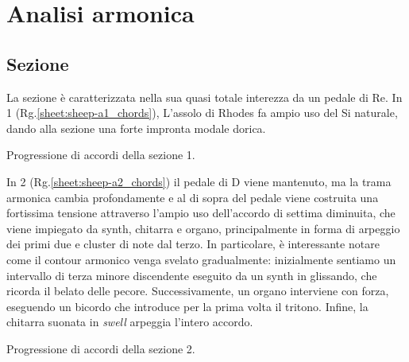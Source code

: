 \documentclass[class=book, crop=false, oneside, 12pt]{standalone}
\begin{document}

    \section{Analisi armonica}
    \label{sec:04-harmony}

    \subsection{Sezione }
    La sezione  è caratterizzata nella sua quasi totale interezza da un pedale di Re. In 1 (Rg.\ref{sheet:sheep-a1_chords}), L'assolo di Rhodes fa ampio uso del Si naturale, dando alla sezione una forte impronta modale dorica.     
    
    \begin{sheet}[htb]
        \centering
        \caption{Progressione di accordi della sezione 1.}
        \label{sheet:sheep-a1_chords}
    \end{sheet}

    In 2 (Rg.\ref{sheet:sheep-a2_chords}) il pedale di D viene mantenuto, ma la trama armonica cambia profondamente e al di sopra del pedale viene costruita una fortissima tensione attraverso l'ampio uso dell'accordo di settima diminuita, che viene impiegato da synth, chitarra e organo, principalmente in forma di arpeggio dei primi due e cluster di note dal terzo. In particolare, è interessante notare come il contour armonico venga svelato gradualmente: inizialmente sentiamo un intervallo di terza minore discendente eseguito da un synth in glissando, che ricorda il belato delle pecore.
    Successivamente, un organo interviene con forza, eseguendo un bicordo che introduce per la prima volta il tritono. Infine, la chitarra suonata in \emph{swell} arpeggia l'intero accordo. 
    
    \begin{sheet}[htb]
        \centering
        \caption{Progressione di accordi della sezione 2.}
        \label{sheet:sheep-a2_chords}
    \end{sheet}
\end{document}

